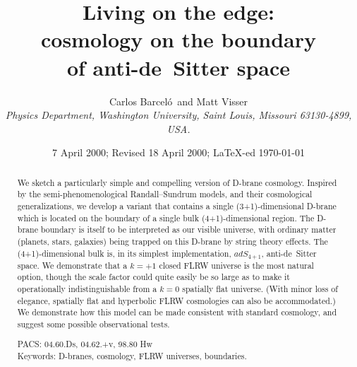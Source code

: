 \documentclass[a4paper,12pt]{article}
\begin{document}
   
\def\Barcelo{Barcel\'o}
\title{{\bf  Living on the edge: \\
\bf cosmology on the boundary \\
\bf of anti-de~Sitter space}}
\author{Carlos \Barcelo\ and Matt Visser\\[2mm]
{\small \it Physics Department, Washington University, 
Saint Louis, Missouri 63130-4899, USA.}}
\date{{\small 7 April 2000; Revised 18 April 2000; \LaTeX-ed \today}}
\maketitle
\begin{abstract}
We sketch a particularly simple and compelling version of D-brane
cosmology. Inspired by the semi-phenomenological Randall--Sundrum
models, and their cosmological generalizations, we develop a variant
that contains a single (3+1)-dimensional D-brane which is located on
the boundary of a single bulk (4+1)-dimensional region. The D-brane
boundary is itself to be interpreted as our visible universe, with
ordinary matter (planets, stars, galaxies) being trapped on this
D-brane by string theory effects. The (4+1)-dimensional bulk is, in
its simplest implementation, $adS_{4+1}$, anti-de~Sitter space.  We
demonstrate that a $k=+1$ closed FLRW universe is the most natural
option, though the scale factor could quite easily be so large as to
make it operationally indistinguishable from a $k=0$ spatially flat
universe. (With minor loss of elegance, spatially flat and hyperbolic
FLRW cosmologies can also be accommodated.) We demonstrate how this
model can be made consistent with standard cosmology, and suggest some
possible observational tests.

\vspace*{5mm}
\noindent
PACS: 04.60.Ds, 04.62.+v, 98.80 Hw
\\
Keywords: D-branes, cosmology, FLRW universes, boundaries.
\end{abstract}
\vfill
\end{document}
